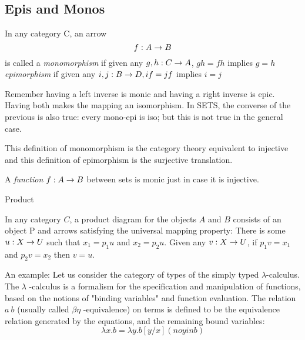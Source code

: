 \documentclass[../../notes.tex]{subfiles}
\begin{document}
\subsection{Epis and Monos}

\begin{definition}

  In any category C, an arrow $$ f : A \rightarrow B $$ is
  called a \textit{monomorphism} if given any $ g, h : C \rightarrow A$,
  $gh = fh$ implies $g = h$ \\

  \textit{epimorphism} if given any $i,j : B \rightarrow D, if = jf$ implies $i = j$


\end{definition}

Remember having a left inverse is monic and having a right inverse is epic. Having both makes the mapping an isomorphism. In SETS, the converse of the previous is also true: every mono-epi is iso; but this is not true in the general case.

This definition of monomorphism is the category theory equivalent to injective and this definition of epimorphism is the surjective translation.


\begin{proposition}

  A \textit{function} $ f : A \rightarrow B$ between sets is monic just in case it is injective. 
  
\end{proposition}

% 

\begin{definition}{Product}

  In any category $C$, a product diagram for the objects $A$ and $B$
  consists of an object P and arrows
  satisfying the universal mapping property: There is some $u: X \rightarrow U$
  such that $x_1 = p_1u$ and $x_2 = p_{2}u$. Given any $v: X \rightarrow U$, if
  $p_{1}v = x_1$ and $p_{2}v = x_2$ then $v = u$.
\end{definition}

An example:
Let us consider the category of types of the simply typed $\lambda$-calculus.
The $\lambda$ -calculus is a formalism for the specification and manipulation of functions, based
on the notions of "binding variables" and function evaluation. The relation $ a ~ b $
(usually called $\beta\eta$ -equivalence) on terms is defined to be the equivalence relation
generated by the equations, and the remaining bound variables:
$$ \lambda x.b = \lambda y.b [y/x] (no y in b) $$
\end{document}
